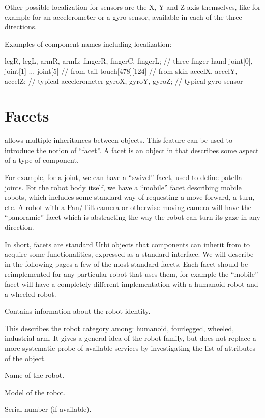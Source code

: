 Other possible localization for sensors are the X, Y and Z axis
themselves, like for example for an accelerometer or a gyro sensor,
available in each of the three directions.


Examples of component names including localization:

\begin{urbifixme}
legR, legL, armR, armL;
fingerR, fingerC, fingerL;      // three-finger hand
joint[0], joint[1] ... joint[5] // from tail
touch[478][124]                 // from skin
accelX, accelY, accelZ;         // typical accelerometer
gyroX, gyroY, gyroZ;            // typical gyro sensor
\end{urbifixme}

\section{Facets}

\urbi allows multiple inheritances between objects. This feature can be
used to introduce the notion of ``facet''. A facet is an object in \urbi
that describes some aspect of a type of component.

For example, for a joint, we can have a ``swivel'' facet, used to define
patella joints. For the robot body itself, we have a ``mobile'' facet
describing mobile robots, which includes some standard way of
requesting a move forward, a turn, etc. A robot with a Pan/Tilt camera
or otherwise moving camera will have the ``panoramic'' facet which is
abstracting the way the robot can turn its gaze in any direction.

In short, facets are standard Urbi objects that components can inherit
from to acquire some functionalities, expressed as a standard
interface. We will describe in the following pages a few of the most
standard facets. Each facet should be reimplemented for any particular
robot that uses them, for example the ``mobile'' facet will have a
completely different implementation with a humanoid robot and a wheeled
robot.


Contains information about the robot identity.

\begin{slots}
  {
    This describes the robot category among: humanoid, fourlegged,
    wheeled, industrial arm. It gives a general idea of the robot
    family, but does not replace a more systematic probe of available
    services by investigating the list of attributes of the object.
  }

  {%
    Name of the robot.%
  }

  {%
    Model of the robot.%
  }

  {%
    Serial number (if available).%
  }

\end{slots}


